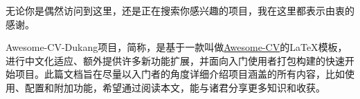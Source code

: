 \makelettertitle\newline
\begin{cvletter}
{\hspace{2em}}无论你是偶然访问到这里，还是正在搜索你感兴趣的项目，我在这里都表示由衷的感谢。

{\hspace{2em}}Awesome-CV-Dukang项目，简称{\dk}，是基于一款叫做\hyperref{https://github.com/posquit0/Awesome-CV}{}{}{Awesome-CV}的{\LaTeX}模板，进行中文化适应、额外提供许多新功能扩展，并面向入门使用者打包构建的快速开始项目。此篇文档旨在尽量以入门者的角度详细介绍{\dk}项目涵盖的所有内容，比如使用、配置和附加功能，希望通过阅读本文，能与诸君分享更多知识和收获。
\end{cvletter}

\makeletterclosing\newline
\clearpage

